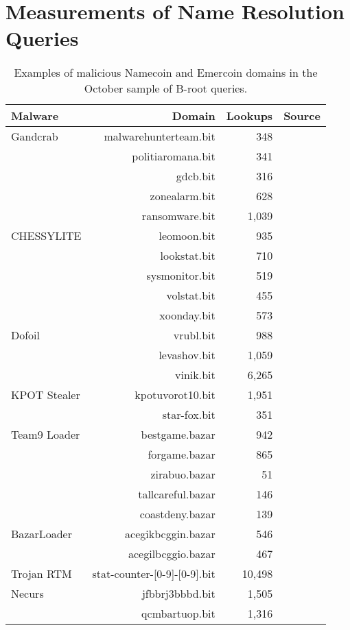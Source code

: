 \section{Measurements of Name Resolution Queries}
\label{sec:b-root}

\begin{table}
	\begin{tabular}{lrrr}
		\toprule
		Malware & Domain & Lookups & Source\\
		\midrule
		Gandcrab	&	malwarehunterteam.bit	&	348	& 
		\cite{trellix_gandcrab} \\
		&	politiaromana.bit	&	341	& \cite{trellix_gandcrab} \\
		&	gdcb.bit	&	316	& \cite{trellix_gandcrab} \\
		&	zonealarm.bit	&	628	& \cite{acronis_gandcrab} \\
		&	ransomware.bit	&	1,039 & \cite{acronis_gandcrab} \\
		CHESSYLITE	&	leomoon.bit	&	935	& \cite{mandiant_chessylite} \\
		&	lookstat.bit	&	710	& \cite{mandiant_chessylite} \\
		&	sysmonitor.bit	&	519	& \cite{mandiant_chessylite} \\
		&	volstat.bit	&	455	& \cite{mandiant_chessylite} \\
		&	xoonday.bit	&	573	& \cite{mandiant_chessylite} \\
		Dofoil	&	vrubl.bit	&	988	& \cite{dofoil_2018} \\
		&	levashov.bit	&	1,059 & \cite{dofoil_2018} \\
		&	vinik.bit	&	6,265 & \cite{dofoil_2018} \\
		KPOT Stealer	&	kpotuvorot10.bit	&	1,951 & \cite{kpot_2021}\\
		&	star-fox.bit	&	351	 & \cite{joesandbox} \\
		Team9 Loader	&	bestgame.bazar	&	942	& \cite{team9_fox-it} \\
		&	forgame.bazar	&	865	& \cite{team9_fox-it} \\
		&	zirabuo.bazar	&	51	& \cite{team9_fox-it} \\
		&	tallcareful.bazar	&	146 & \cite{team9_fox-it} 	\\
		&	coastdeny.bazar	&	139	& \cite{team9_fox-it} \\
		BazarLoader	&	acegikbcggin.bazar	&	546	& \cite{baza_proofpoint} \\
		&	acegilbcggio.bazar	&	467	& \cite{baza_proofpoint} \\
		Trojan RTM	&	stat-counter-[0-9]-[0-9].bit & 10,498 & 
		\cite{sudonull_trojanrtm} \\
		Necurs	&	jfbbrj3bbbd.bit	&	1,505 & \cite{threatcrowd_necurs}\\
		& qcmbartuop.bit & 1,316 & \cite{dgas_of_necurs} \\
		\bottomrule
	\end{tabular}
	\caption{Examples of malicious Namecoin and Emercoin domains in the October 
		sample of B-root 
		queries.}
	\label{tab:namecoin_emercoin}
\end{table}

